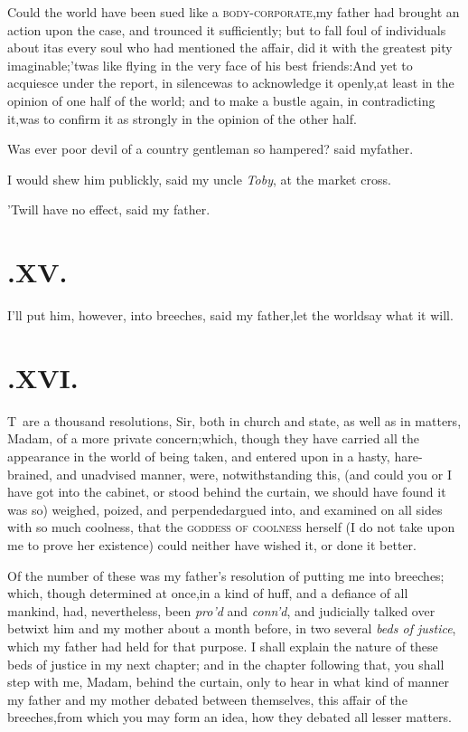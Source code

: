 \documentclass{article}
\begin{document}
Could the world have been sued like a
\textsc{body-corporate},\tsk my father had brought an
action upon the case, and trounced it sufficiently; but to fall
foul of individuals about it\tsh as every soul who had
mentioned the affair, did it with the greatest pity
imaginable;\tsh ’twas like flying in the very face
of his best friends:\tsh And yet to acquiesce under the
report, in silence\tsk was to acknowledge it openly,\tsk at
least in the opinion of one half of the world; and to make a bustle
again, in contradicting it,\tsk was to confirm it as strongly in
the opinion of the other half.\tsh

\tsh Was ever poor devil of a country gentleman so
hampered? said my\break father.

I would shew him publickly, said my uncle \textit{Toby}, at the
market cross.

\tsh ’Twill have no effect, said my father.

\section{.\enspace XV.}

\tsh I’ll put him, however, into\break
breeches, said my father,\tsk let the world\break say what it will.

\section{.\enspace XVI.}

\lettrine{T}{\,} are a thousand resolutions,\break
Sir, both in church and state, as well as in matters, Madam, of a
more private concern;\tsk which, though they have carried all the
appearance in the world of being taken, and entered upon in a
hasty, hare-brained, and unadvised manner, were, notwithstanding
this, (and could you or I have got into the cabinet, or stood
behind the curtain, we should have found it was so) weighed,
poized, and perpended\tsh argued
 into, and
examined on all sides with so much coolness, that the
\textsc{goddess of coolness} herself (I do not take upon me
to prove her existence) could neither have wished it, or done it
better.

Of the number of these was my father’s resolution of
putting me into breeches; which, though determined at
once,\tsk in a kind of huff, and a defiance of all mankind, had,
nevertheless, been \textit{pro’d} and \textit{conn’d}, and
judicially talked over betwixt him and my mother about a month
before, in two several \textit{beds of justice}, which my father had
held for that purpose. I shall explain the nature of these beds of
justice in my next chapter; and in the chapter following that, you
shall step with me, Madam, behind the curtain, only to hear in what
kind of manner my father and my mother debated between themselves,
this affair of the breeches,\tsk from which you may form an idea,
how they debated all lesser matters.
\end{document}
